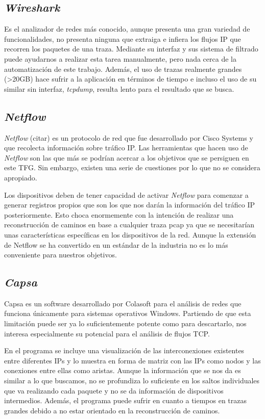 \documentclass[twoside, 12pt]{epstfg}
\begin{document}
\subsection{\textit{Wireshark}}
Es el analizador de redes más conocido, aunque presenta una gran variedad de funcionalidades, no presenta ninguna que extraiga e infiera los flujos IP que recorren los paquetes de una traza. Mediante su interfaz y sus sistema de filtrado puede ayudarnos a realizar esta tarea manualmente, pero nada cerca de la automatización de este trabajo. Además, el uso de trazas realmente grandes (>20GB) hace sufrir a la aplicación en términos de tiempo e incluso el uso de su similar sin interfaz, \textit{tcpdump}, resulta lento para el resultado que se busca.

\subsection{\textit{Netflow}}
\textit{Netflow} (citar) es un protocolo de red que fue desarrollado por Cisco Systems y que recolecta información sobre tráfico IP. Las herramientas que hacen uso de \textit{Netflow} son las que más se podrían acercar a los objetivos que se persiguen en este TFG. Sin embargo, existen una serie de cuestiones por lo que no se considera apropiado.

Los dispositivos deben de tener capacidad de activar \textit{Netflow} para comenzar a generar registros propios que son los que nos darán la información del tráfico IP posteriormente. Esto choca enormemente con la intención de realizar una reconstrucción de caminos en base a cualquier traza pcap ya que se necesitarían unas características específicas en los dispositivos de la red. Aunque la extensión de Netflow se ha convertido en un estándar de la industria no es lo más conveniente para nuestros objetivos.

\subsection{\textit{Capsa}} 
Capsa \cite{ColasoftCapsa} es un software desarrollado por Colasoft para el análisis de redes que funciona únicamente para sistemas operativos Windows. Partiendo de que esta limitación puede ser ya lo suficientemente potente como para descartarlo, nos interesa especialmente su potencial para el análisis de flujos TCP.

En el programa se incluye una visualización de las interconexiones existentes entre diferentes IPs y lo muestra en forma de matriz con las IPs como nodos y las conexiones entre ellas como aristas. Aunque la información que se nos da es similar a lo que buscamos, no se profundiza lo suficiente en los saltos individuales que va realizando cada paquete y no se da información de dispositivos intermedios. Además, el programa puede sufrir en cuanto a tiempos en trazas grandes debido a no estar orientado en la reconstrucción de caminos.
\end{document}
